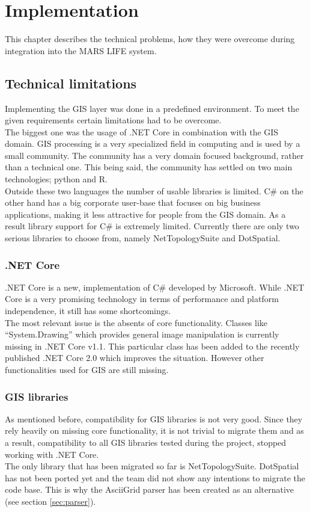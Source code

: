 
\chapter{Implementation}
This chapter describes the technical problems, how they were overcome during integration into the MARS LIFE system.



\section{Technical limitations}
Implementing the GIS layer was done in a predefined environment. To meet the given requirements certain limitations had to be overcome.\\
The biggest one was the usage of .NET Core in combination with the GIS domain. GIS processing is a very specialized field in computing and is used by a small community. The community has a very domain focused background, rather than a technical one. This being said, the community has settled on two main technologies; python and R.\\
Outside these two languages the number of usable libraries is limited. C\# on the other hand has a big corporate user-base that focuses on big business applications, making it less attractive for people from the GIS domain. As a result library support for C\# is extremely limited. Currently there are only two serious libraries to choose from, namely NetTopologySuite and DotSpatial.\\


\subsection{.NET Core}
.NET Core is a new, implementation of C\# developed by Microsoft. While .NET Core is a very promising technology in terms of performance and platform independence, it still has some shortcomings.\\
The most relevant issue is the absents of core functionality. Classes like \enquote{System.Drawing} which provides general image manipulation is currently missing in .NET Core v1.1. This particular class has been added to the recently published .NET Core 2.0 which improves the situation. However other functionalities used for GIS are still missing.


\subsection{GIS libraries}
As mentioned before, compatibility for GIS libraries is not very good. Since they rely heavily on missing core functionality, it is not trivial to migrate them and as a result, compatibility to all GIS libraries tested during the project, stopped working with .NET Core.\\
The only library that has been migrated so far is NetTopologySuite. DotSpatial has not been ported yet and the team did not show any intentions to migrate the code base. This is why the AsciiGrid parser has been created as an alternative (see section \ref{sec:parser}).



